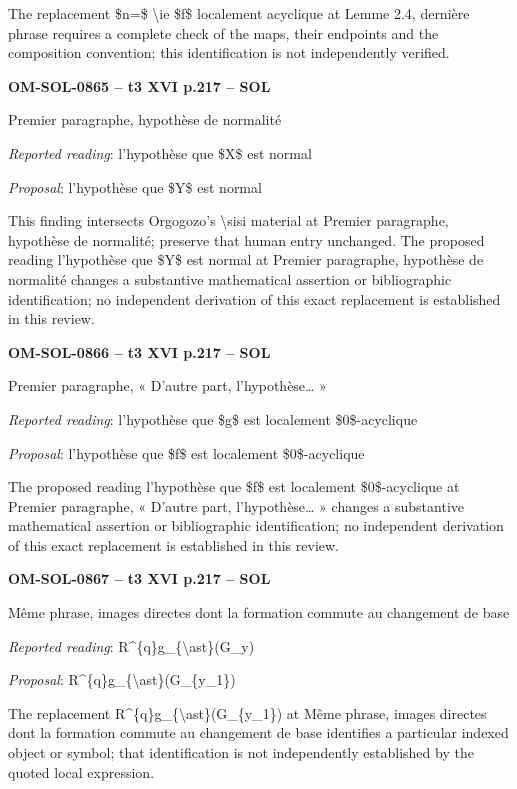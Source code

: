 The replacement \$n=\$ \textbackslash{}ie \$f\$ localement acyclique at Lemme 2.4, dernière phrase requires a complete check of the maps, their endpoints and the composition convention; this identification is not independently verified.\par
\par\noindent\textbf{OM-SOL-0865 -- t3 XVI p.217 -- SOL}\par
Premier paragraphe, hypothèse de normalité\par
\emph{Reported reading}: l'hypothèse que \$X\$ est normal\par
\emph{Proposal}: l'hypothèse que \$Y\$ est normal\par
This finding intersects Orgogozo's \textbackslash{}sisi material at Premier paragraphe, hypothèse de normalité; preserve that human entry unchanged. The proposed reading l'hypothèse que \$Y\$ est normal at Premier paragraphe, hypothèse de normalité changes a substantive mathematical assertion or bibliographic identification; no independent derivation of this exact replacement is established in this review.\par
\par\noindent\textbf{OM-SOL-0866 -- t3 XVI p.217 -- SOL}\par
Premier paragraphe, « D'autre part, l'hypothèse… »\par
\emph{Reported reading}: l'hypothèse que \$g\$ est localement \$0\$-acyclique\par
\emph{Proposal}: l'hypothèse que \$f\$ est localement \$0\$-acyclique\par
The proposed reading l'hypothèse que \$f\$ est localement \$0\$-acyclique at Premier paragraphe, « D'autre part, l'hypothèse… » changes a substantive mathematical assertion or bibliographic identification; no independent derivation of this exact replacement is established in this review.\par
\par\noindent\textbf{OM-SOL-0867 -- t3 XVI p.217 -- SOL}\par
Même phrase, images directes dont la formation commute au changement de base\par
\emph{Reported reading}: R\textasciicircum{}\{q\}g\_\{\textbackslash{}ast\}(G\_y)\par
\emph{Proposal}: R\textasciicircum{}\{q\}g\_\{\textbackslash{}ast\}(G\_\{y\_1\})\par
The replacement R\textasciicircum{}\{q\}g\_\{\textbackslash{}ast\}(G\_\{y\_1\}) at Même phrase, images directes dont la formation commute au changement de base identifies a particular indexed object or symbol; that identification is not independently established by the quoted local expression.\par
